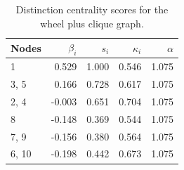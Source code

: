 \begin{table}
\centering
\caption{\label{tab:wc}Distinction centrality scores for the wheel plus clique graph.}
\centering
\begin{tabular}[t]{lrrrr}
\toprule
Nodes & $\beta_i$ & $s_i$ & $\kappa_i$ & $\alpha$\\
\midrule
1 & 0.529 & 1.000 & 0.546 & 1.075\\
3, 5 & 0.166 & 0.728 & 0.617 & 1.075\\
2, 4 & -0.003 & 0.651 & 0.704 & 1.075\\
8 & -0.148 & 0.369 & 0.544 & 1.075\\
7, 9 & -0.156 & 0.380 & 0.564 & 1.075\\
6, 10 & -0.198 & 0.442 & 0.673 & 1.075\\
\bottomrule
\end{tabular}
\end{table}
